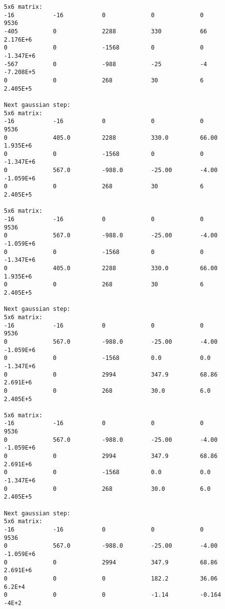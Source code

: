 \documentclass[letterpaper,12pt]{article}
\begin{document}
\begin{verbatim}
5x6 matrix:
-16           -16           0             0             0             9536          
-405          0             2288          330           66            2.176E+6      
0             0             -1568         0             0             -1.347E+6     
-567          0             -988          -25           -4            -7.208E+5     
0             0             268           30            6             2.405E+5      

Next gaussian step:
5x6 matrix:
-16           -16           0             0             0             9536          
0             405.0         2288          330.0         66.00         1.935E+6      
0             0             -1568         0             0             -1.347E+6     
0             567.0         -988.0        -25.00        -4.00         -1.059E+6     
0             0             268           30            6             2.405E+5      

5x6 matrix:
-16           -16           0             0             0             9536          
0             567.0         -988.0        -25.00        -4.00         -1.059E+6     
0             0             -1568         0             0             -1.347E+6     
0             405.0         2288          330.0         66.00         1.935E+6      
0             0             268           30            6             2.405E+5      

Next gaussian step:
5x6 matrix:
-16           -16           0             0             0             9536          
0             567.0         -988.0        -25.00        -4.00         -1.059E+6     
0             0             -1568         0.0           0.0           -1.347E+6     
0             0             2994          347.9         68.86         2.691E+6      
0             0             268           30.0          6.0           2.405E+5      

5x6 matrix:
-16           -16           0             0             0             9536          
0             567.0         -988.0        -25.00        -4.00         -1.059E+6     
0             0             2994          347.9         68.86         2.691E+6      
0             0             -1568         0.0           0.0           -1.347E+6     
0             0             268           30.0          6.0           2.405E+5      

Next gaussian step:
5x6 matrix:
-16           -16           0             0             0             9536          
0             567.0         -988.0        -25.00        -4.00         -1.059E+6     
0             0             2994          347.9         68.86         2.691E+6      
0             0             0             182.2         36.06         6.2E+4        
0             0             0             -1.14         -0.164        -4E+2         


\end{verbatim}
\end{document}
